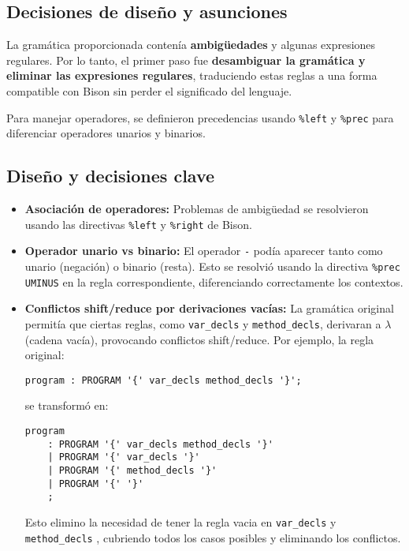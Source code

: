 \documentclass[12pt,a4paper]{article}
\begin{document}
\subsection{Decisiones de diseño y asunciones}
La gramática proporcionada contenía \textbf{ambigüedades} y algunas expresiones regulares. Por lo tanto, el primer paso fue \textbf{desambiguar la gramática y eliminar las expresiones regulares}, traduciendo estas reglas a una forma compatible con Bison sin perder el significado del lenguaje.

Para manejar operadores, se definieron precedencias usando \texttt{\%left} y \texttt{\%prec} para diferenciar operadores unarios y binarios.

\subsection{Diseño y decisiones clave}
\begin{itemize}
    \item \textbf{Asociación de operadores:} Problemas de ambigüedad se resolvieron usando las directivas \texttt{\%left} y \texttt{\%right} de Bison.
    
    \item \textbf{Operador unario vs binario:} El operador \texttt{-} podía aparecer tanto como unario (negación) o binario (resta). Esto se resolvió usando la directiva \texttt{\%prec UMINUS} en la regla correspondiente, diferenciando correctamente los contextos.
    
    \item \textbf{Conflictos shift/reduce por derivaciones vacías:}  
    La gramática original permitía que ciertas reglas, como \texttt{var\_decls} y \texttt{method\_decls}, derivaran a \(\lambda\) (cadena vacía), provocando conflictos shift/reduce.  
    Por ejemplo, la regla original:
    \begin{verbatim}
program : PROGRAM '{' var_decls method_decls '}';
    \end{verbatim}
    se transformó en:
    \begin{verbatim}
program
    : PROGRAM '{' var_decls method_decls '}'
    | PROGRAM '{' var_decls '}'
    | PROGRAM '{' method_decls '}'
    | PROGRAM '{' '}'
    ;
    \end{verbatim}
    Esto elimino la necesidad de tener la regla vacia en \texttt{var\_decls} y \texttt{method\_decls} , cubriendo todos los casos posibles y eliminando los conflictos.
\end{itemize}
\end{document}
